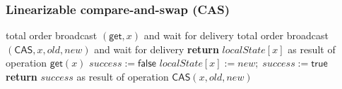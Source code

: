 \begin{frame}
    \label{s:cas-2}
    \frametitle{Linearizable compare-and-swap (CAS)}
    \footnotesize
    \begin{algorithmic}
            \State total order broadcast $(\mathsf{get}, x)$ and wait for delivery
        \EndOn
        \State
            \State total order broadcast $(\mathsf{CAS}, x, \mathit{old}, \mathit{new})$ and wait for delivery
        \EndOn
        \State
            \State \textbf{return} $\mathit{localState}[x]$ as result of operation $\mathsf{get}(x)$
        \EndOn
        \State
            \State $\mathit{success} := \mathsf{false}$
                \State $\mathit{localState}[x] := \mathit{new};\; \mathit{success} := \mathsf{true}$
            \EndIf
            \State \textbf{return} $\mathit{success}$ as result of operation $\mathsf{CAS}(x, \mathit{old}, \mathit{new})$
        \EndOn
    \end{algorithmic}
\end{frame}
\label{l:cas-2}

